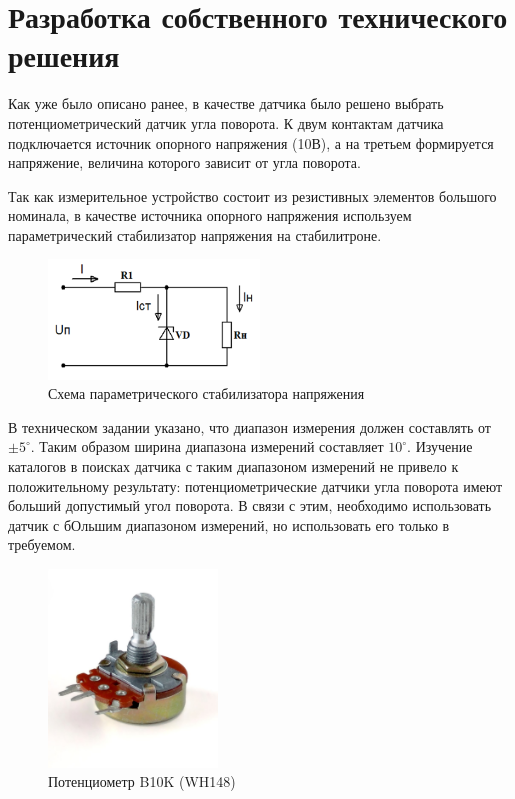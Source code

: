 \section{Разработка собственного технического решения}
\label{sec:---}
Как уже было описано ранее, в качестве датчика было решено выбрать потенциометрический датчик угла поворота.
К двум контактам датчика подключается источник опорного напряжения (10В), а на третьем формируется напряжение, величина которого зависит от угла поворота.

Так как измерительное устройство состоит из резистивных элементов большого номинала, в качестве источника опорного напряжения используем параметрический стабилизатор напряжения на стабилитроне.
\begin{figure}[!h]
    \centering
    \includegraphics[width=0.5\textwidth]{img/img_4}
    \caption{Схема параметрического стабилизатора напряжения}
    \label{fig:img_4}
\end{figure}

В техническом задании указано, что диапазон измерения должен составлять от $\pm 5 ^\circ$.
Таким образом ширина диапазона измерений составляет $10^\circ$.
Изучение каталогов в поисках датчика с таким диапазоном измерений не привело к положительному результату: потенциометрические датчики угла поворота имеют больший допустимый угол поворота.
В связи с этим, необходимо использовать датчик с бОльшим диапазоном измерений, но использовать его только в требуемом.

\begin{figure}[!h]
    \centering
    \includegraphics[width=0.4\textwidth]{img/img_3}
    \caption{Потенциометр B10K (WH148)}
    \label{fig:img3}
\end{figure}


